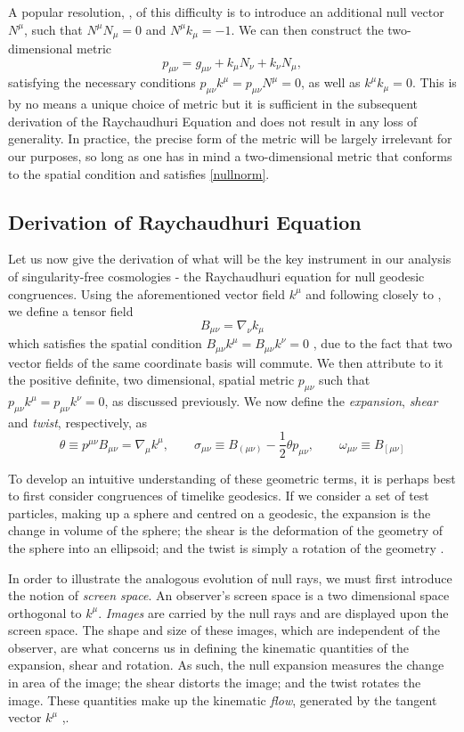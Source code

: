  A popular  resolution, \cite{Kar:2006ms}, of this difficulty is to introduce an additional null vector $N^\mu$, such that $N^\mu N_\mu=0$ and $N^\mu k_\mu=-1$. We can then construct the two-dimensional metric
\[
\label{nullmetric}
p_{\mu\nu}=g_{\mu\nu}+k_\mu N_\nu +k_\nu N_\mu 
,\]
satisfying the necessary conditions $p_{\mu\nu}k^\mu=p_{\mu\nu}N^\mu=0$, as well as $k^\mu k_\mu=0$. This is by no means a unique choice of metric but it is sufficient in the subsequent derivation of the Raychaudhuri Equation and does not result in any loss of generality. In practice, the precise form of the metric will be largely irrelevant for our purposes, so long as one has in mind a two-dimensional metric that conforms to the spatial condition and satisfies \eqref{nullnorm}.
 
\subsection{Derivation of Raychaudhuri Equation}
Let us now give the derivation of what will be the key instrument in our analysis of singularity-free cosmologies - the Raychaudhuri equation for null geodesic congruences. Using the aforementioned vector field $k^{\mu}$  and following closely to \cite{Wald:GR}, we define a tensor field
\[
\label{DefB}
B_{\mu\nu}=\nabla_{\nu}k_{\mu}
 \]
which satisfies the spatial condition $B_{\mu\nu}k^{\mu}=B_{\mu\nu}k^{\nu}=0$
 , due to the fact that two vector fields of the same coordinate basis will commute. We then attribute to it the positive definite, two dimensional, spatial metric $p_{\mu\nu}$ such that $p_{\mu\nu}k^{\mu}=p_{\mu\nu}k^{\nu}=0$, as discussed previously.  We now define the \emph{expansion}, \emph{shear} \cite{Sommers} and \emph{twist}, respectively, as
\[
\label{expshtw}
\theta\equiv p^{\mu\nu}B_{\mu\nu}=\nabla_{\mu}k^{\mu},\qquad\sigma_{\mu\nu}\equiv B_{(\mu\nu)}-\frac{1}{2}\theta p_{\mu\nu},\qquad\omega_{\mu\nu}\equiv B_{[\mu\nu]}
 \]
 
To develop an intuitive understanding of these geometric terms, it is perhaps best to first consider congruences of timelike geodesics. If we consider a set of test particles, making up a sphere and centred on a geodesic, the expansion is the change in volume of the sphere; the shear is the deformation of the geometry of the sphere into an ellipsoid; and the twist is simply a rotation of the geometry \cite{tHooft:2009bh}.

In order to illustrate the analogous evolution of null rays, we must first introduce the notion of \emph{screen space}. An observer's screen space is a two dimensional space orthogonal to $k^\mu$. \emph{Images} are carried by the null rays and are displayed upon the screen space. The shape and size of these images, which are independent of the observer, are what concerns us in defining the kinematic quantities of the expansion, shear and rotation. As such, the null expansion measures the change in area of the image; the shear distorts the image; and the twist rotates the image. These quantities make up the kinematic \emph{flow}, generated by the tangent vector $k^\mu$ \cite{ellis2012relativistic},\cite{Kar:2006ms}.
 
